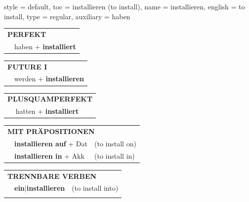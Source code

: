 \begin{verbentry}{
  style = {default},
  toc = {installieren (to install)},
  name = {installieren},
  english = {to install},
  type = {regular},
  auxiliary = {haben}
}
 \begin{tabular}{rl}
     \multicolumn{2}{l}{\textbf{PERFEKT}}\\
   & haben + \textbf{installiert}\\
  \end{tabular}
\hfill
\begin{tabular}{rl}
    \multicolumn{2}{l}{\textbf{FUTURE I}}\\
   & werden + \textbf{installieren}\\
  \end{tabular}
\hfill
\begin{tabular}{rl}
    \multicolumn{2}{l}{\textbf{PLUSQUAMPERFEKT}}\\
   & hatten + \textbf{installiert}\\
  \end{tabular}

 \vspace{10pt}

\begin{tabular}{lll}
      \multicolumn{3}{l}{\textbf{MIT PRÄPOSITIONEN}}\\
& \textbf{installieren auf} + Dat & (to install on)\\
& \textbf{installieren in} + Akk & (to install in)\\
\end{tabular}
  \hfill
\begin{tabular}{lll}
      \multicolumn{3}{l}{\textbf{TRENNBARE VERBEN}}\\
 & \textbf{ein$|$installieren} & (to install into)\\
\vspace{10pt}
  \end{tabular}

\vspace{-5pt}
\end{verbentry}
